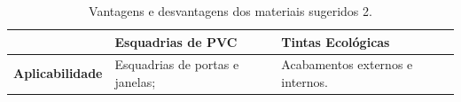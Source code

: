 \begin{table}[]
\centering
\caption{Vantagens e desvantagens dos materiais sugeridos 2.}
\label{my-label}
\begin{tabular}{|l|l|l|}
\hline
\textbf{}               & \parbox[t]{4cm}{Esquadrias de PVC}                                                                                                                                                                                                                                                                                                       & \parbox[t]{4cm}{Tintas Ecológicas}                                                                                                                                                                                                                                                                                                                                                                                                             \\ \hline
\textbf{Aplicabilidade} & \parbox[t]{4cm}{Esquadrias de portas e janelas;}                                                                                                                                                                                                                                                                                         & \parbox[t]{4cm}{Acabamentos externos e internos.}                                                                                                                                                                                                                                                                                                                                                                                              \\ \hline

\end{tabular}
\end{table}
